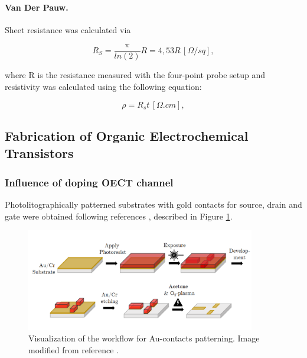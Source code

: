 \paragraph{Van Der Pauw.}Sheet resistance was calculated via

\begin{equation}\label{eq:rs}
	R_{S} = \frac{\pi}{ln(2)}R = 4,53 R \, [\Omega/sq],
\end{equation}

where R is the resistance measured with the four-point probe setup and resistivity was calculated using the following equation:

\begin{equation}\label{eq:resist}
	\rho = R_{s}t \, [\Omega.cm],
\end{equation}
 

\subsection{Fabrication of Organic Electrochemical Transistors}

\subsubsection{Influence of doping OECT channel} \label{subsec:photo}

Photolitographically patterned substrates with gold contacts for source, drain and gate were obtained following references \cite{weissbachPhotopatternableSolidElectrolyte2022} \cite{bongartzOrganicElectrochemicalTransistors2021}, described in Figure \ref{fig:aupat}.

\begin{figure}[ht]
	\centering
	\includegraphics[width=10cm]{Images/pdf/Au-patterning.pdf}
	\caption[Visualization of the workflow for Au-contacts patterning.]{Visualization of the workflow for Au-contacts patterning. Image modified from reference \cite{bongartzOrganicElectrochemicalTransistors2021}.}
	\label{fig:aupat}
\end{figure}

